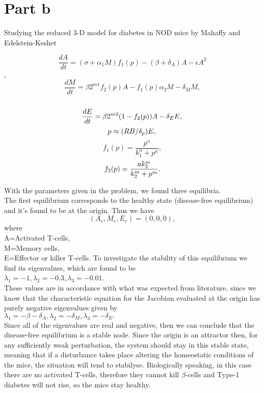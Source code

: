 \section{Part b}
Studying the reduced 3-D model for diabetes in NOD mice by Mahaffy and Edelstein-Keshet 

$$\frac{dA}{dt} = (\sigma + \alpha_{1}M)f_{1}(p) - (\beta + \delta_{A})A - \epsilon A^{2}$$, \\
$$\frac{dM}{dt} = \beta 2^{m1}f_{2}(p)A - f_{1}(p)\alpha_{2}M - \delta_{M}M,$$\\
$$
\frac{dE}{dt}= \beta 2^{m2}(1-f_{2}(p))A - \delta_{E}E, \\
$$
$$
p \approx (RB/\delta_{p})E, \\
$$
$$f_{1}(p) = \frac{p^{n}}{k_{1}^{n} + p^{n}},$$
$$
f_{2}(p)= \frac{ak_{2}^{m}}{k_{2}^{m} + p^{m}}. \\
$$

With the parameters given in the problem, we found three equilibria.\\
The first equilibrium corresponds to the healthy state (disease-free equilibrium) and it's found to be at the origin. Thus we have
$$
(A_{e},M_{e},E_{e})= (0,0,0),
$$
where\\
A=Activated T-cells,\\ M=Memory cells,\\ E=Effector or killer T-cells.
To investigate the stability of this equilibrium we find its eigenvalues, which are found to be\\
$\lambda_{1}=-1, \lambda_{2}=-0.3, \lambda_{3}=-0.01$.\\
These values are in accordance with what was expected from literature, since we know that the characteristic equation for the Jacobian evaluated at the origin has purely negative eigenvalues given by\\
$\lambda_{1}=-\beta - \delta_{A}, \lambda_{2}=-\delta_{M}, \lambda_{3}=-\delta_{E}.$\\
Since all of the eigenvalues are real and negative, then we can conclude that the disease-free equilibrium is a stable node. Since the origin is an attractor then, for any sufficiently weak perturbation, the system should stay in this stable state, meaning that if a disturbance takes place altering the homeostatic conditions of the mice, the situation will tend to stabilyse. Biologically speaking, in this case there are no activated T-cells, therefore they cannot kill $\beta$-cells and Type-1 diabetes will not rise, so the mice stay healthy.\\


